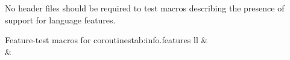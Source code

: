 \pnum
No header files should be required to test macros describing the presence
of support for language features.

\begin{floattable}{Feature-test macros for coroutines}{tab:info.features}
{ll}
\topline
{} &  \\
\capsep
{}  &       \\
\end{floattable}

%
